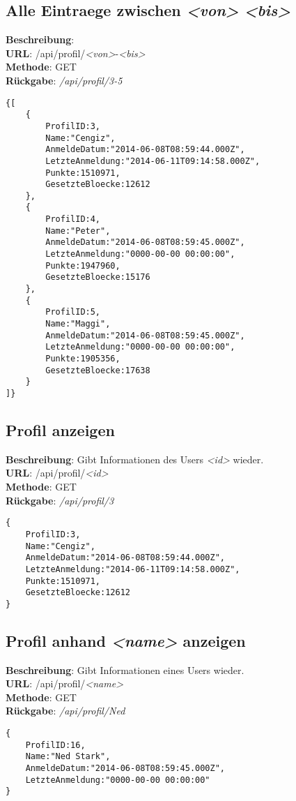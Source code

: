 \documentclass[11pt,a4paper]{article} %
\begin{document}
\subsection*{Alle Eintraege zwischen \textit{<von>} \textit{<bis>}}
\textbf{Beschreibung}: \\
\textbf{URL}: /api/profil/\textit{<von>}-\textit{<bis>}\\
\textbf{Methode}: GET\\
\textbf{Rückgabe}: \textcolor{kommi}{\textit{/api/profil/3-5}}\\ 
\begin{lstlisting}
{[
	{
		ProfilID:3,
		Name:"Cengiz",
		AnmeldeDatum:"2014-06-08T08:59:44.000Z",
		LetzteAnmeldung:"2014-06-11T09:14:58.000Z",
		Punkte:1510971,
		GesetzteBloecke:12612
	},	
	{
		ProfilID:4,
		Name:"Peter",
		AnmeldeDatum:"2014-06-08T08:59:45.000Z",
		LetzteAnmeldung:"0000-00-00 00:00:00",
		Punkte:1947960,
		GesetzteBloecke:15176
	},
	{
		ProfilID:5,
		Name:"Maggi",
		AnmeldeDatum:"2014-06-08T08:59:45.000Z",
		LetzteAnmeldung:"0000-00-00 00:00:00",
		Punkte:1905356,
		GesetzteBloecke:17638
	}
]}
\end{lstlisting}

\subsection*{Profil anzeigen}
\textbf{Beschreibung}: Gibt Informationen des Users \textit{<id>} wieder.\\
\textbf{URL}: /api/profil/\textit{<id>}\\
\textbf{Methode}: GET\\
\textbf{Rückgabe}: \textcolor{kommi}{\textit{/api/profil/3}}\\
\begin{lstlisting}
{
	ProfilID:3,
	Name:"Cengiz",
	AnmeldeDatum:"2014-06-08T08:59:44.000Z",
	LetzteAnmeldung:"2014-06-11T09:14:58.000Z",
	Punkte:1510971,
	GesetzteBloecke:12612
}
\end{lstlisting}

\subsection*{Profil anhand \textit{<name>} anzeigen}
\textbf{Beschreibung}: Gibt Informationen eines Users wieder.\\
\textbf{URL}: /api/profil/\textit{<name>}\\
\textbf{Methode}: GET\\
\textbf{Rückgabe}: \textcolor{kommi}{\textit{/api/profil/Ned}}\\
\begin{lstlisting}
{
	ProfilID:16,
	Name:"Ned Stark",
	AnmeldeDatum:"2014-06-08T08:59:45.000Z",
	LetzteAnmeldung:"0000-00-00 00:00:00"
}
\end{lstlisting}
\end{document}

